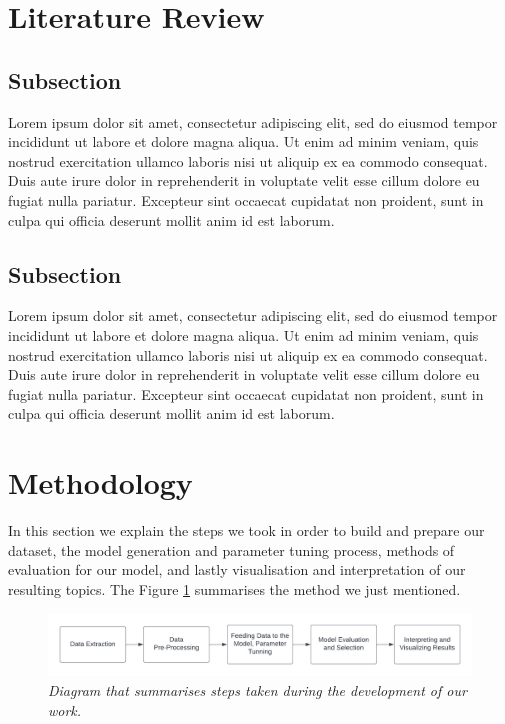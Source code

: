 \documentclass[twoside,11pt,a4paper]{article}
\begin{document}
\clearpage
\section{Literature Review}
\subsection{Subsection}
Lorem ipsum dolor sit amet, consectetur adipiscing elit, sed do eiusmod tempor incididunt ut labore et dolore magna aliqua. Ut enim ad minim veniam, quis nostrud exercitation ullamco laboris nisi ut aliquip ex ea commodo consequat. Duis aute irure dolor in reprehenderit in voluptate velit esse cillum dolore eu fugiat nulla pariatur. Excepteur sint occaecat cupidatat non proident, sunt in culpa qui officia deserunt mollit anim id est laborum.

\subsection{Subsection}
Lorem ipsum dolor sit amet, consectetur adipiscing elit, sed do eiusmod tempor incididunt ut labore et dolore magna aliqua. Ut enim ad minim veniam, quis nostrud exercitation ullamco laboris nisi ut aliquip ex ea commodo consequat. Duis aute irure dolor in reprehenderit in voluptate velit esse cillum dolore eu fugiat nulla pariatur. Excepteur sint occaecat cupidatat non proident, sunt in culpa qui officia deserunt mollit anim id est laborum.

\clearpage
\section{Methodology}
In this section we explain the steps we took in order to build and prepare our dataset, the model generation and parameter tuning process, methods of evaluation for our model, and lastly visualisation and interpretation of our resulting topics. The Figure \ref{fig:method_1} summarises the method we just mentioned.\\

\begin{figure}[h]
\centering
\includegraphics[scale=0.7]{method_1.png}
\caption{\textit{Diagram that summarises steps taken during the development of our work.}}
\label{fig:method_1}
\end{figure}
\end{document}
